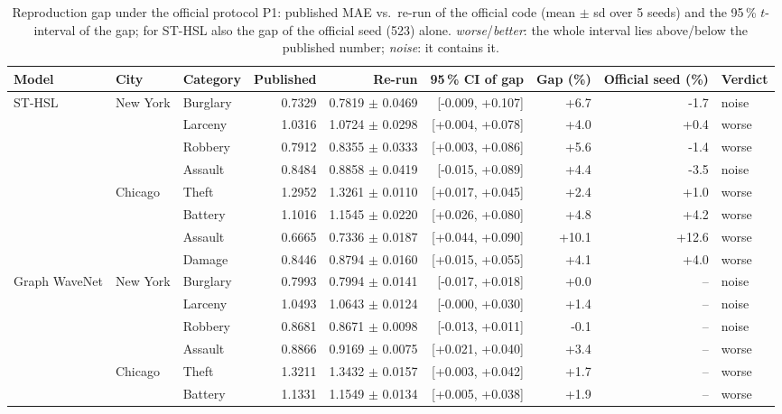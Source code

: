 \begin{table}[H]\centering\scriptsize\setlength{\tabcolsep}{3.5pt}
\caption{Reproduction gap under the official protocol P1: published MAE vs.\ re-run of the official code (mean $\pm$ sd over 5 seeds) and the 95\,\% $t$-interval of the gap; for ST-HSL also the gap of the official seed (523) alone. \emph{worse}/\emph{better}: the whole interval lies above/below the published number; \emph{noise}: it contains it.}\label{tab:repro}
\begin{adjustbox}{max width=\linewidth}\begin{tabular}{lllrrrrrl}\toprule
Model & City & Category & Published & Re-run & 95\,\% CI of gap & Gap (\%) & Official seed (\%) & Verdict\\\midrule
ST-HSL & New York & Burglary & 0.7329 & 0.7819 $\pm$ 0.0469 & [-0.009, +0.107] & +6.7 & -1.7 & noise \\
 &  & Larceny & 1.0316 & 1.0724 $\pm$ 0.0298 & [+0.004, +0.078] & +4.0 & +0.4 & worse \\
 &  & Robbery & 0.7912 & 0.8355 $\pm$ 0.0333 & [+0.003, +0.086] & +5.6 & -1.4 & worse \\
 &  & Assault & 0.8484 & 0.8858 $\pm$ 0.0419 & [-0.015, +0.089] & +4.4 & -3.5 & noise \\
 & Chicago & Theft & 1.2952 & 1.3261 $\pm$ 0.0110 & [+0.017, +0.045] & +2.4 & +1.0 & worse \\
 &  & Battery & 1.1016 & 1.1545 $\pm$ 0.0220 & [+0.026, +0.080] & +4.8 & +4.2 & worse \\
 &  & Assault & 0.6665 & 0.7336 $\pm$ 0.0187 & [+0.044, +0.090] & +10.1 & +12.6 & worse \\
 &  & Damage & 0.8446 & 0.8794 $\pm$ 0.0160 & [+0.015, +0.055] & +4.1 & +4.0 & worse \\
\midrule
Graph WaveNet & New York & Burglary & 0.7993 & 0.7994 $\pm$ 0.0141 & [-0.017, +0.018] & +0.0 & -- & noise \\
 &  & Larceny & 1.0493 & 1.0643 $\pm$ 0.0124 & [-0.000, +0.030] & +1.4 & -- & noise \\
 &  & Robbery & 0.8681 & 0.8671 $\pm$ 0.0098 & [-0.013, +0.011] & -0.1 & -- & noise \\
 &  & Assault & 0.8866 & 0.9169 $\pm$ 0.0075 & [+0.021, +0.040] & +3.4 & -- & worse \\
 & Chicago & Theft & 1.3211 & 1.3432 $\pm$ 0.0157 & [+0.003, +0.042] & +1.7 & -- & worse \\
 &  & Battery & 1.1331 & 1.1549 $\pm$ 0.0134 & [+0.005, +0.038] & +1.9 & -- & worse \\

\end{tabular}
\end{adjustbox}
\end{table}
